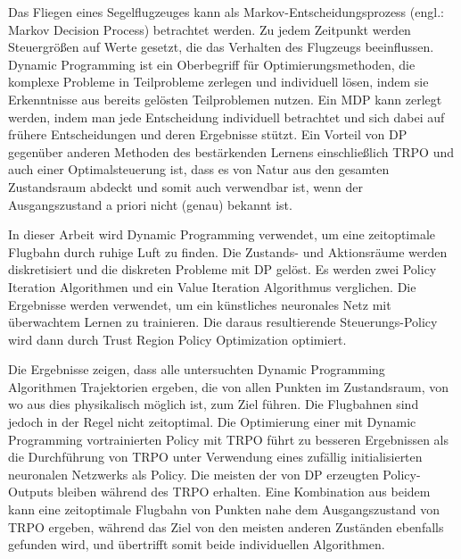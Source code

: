 Das Fliegen eines Segelflugzeuges kann als Markov-Entscheidungsprozess (engl.: Markov Decision Process) betrachtet werden. Zu jedem Zeitpunkt werden Steuergrößen auf Werte gesetzt, die das Verhalten des Flugzeugs beeinflussen. Dynamic Programming ist ein Oberbegriff für Optimierungsmethoden, die komplexe Probleme in Teilprobleme zerlegen und individuell lösen, indem sie Erkenntnisse aus bereits gelösten Teilproblemen nutzen. Ein MDP kann zerlegt werden, indem man jede Entscheidung individuell betrachtet und sich dabei auf frühere Entscheidungen und deren Ergebnisse stützt. Ein Vorteil von DP gegenüber anderen Methoden des bestärkenden Lernens einschließlich TRPO und auch einer Optimalsteuerung ist, dass es von Natur aus den gesamten Zustandsraum abdeckt und somit auch verwendbar ist, wenn der Ausgangszustand a priori nicht (genau) bekannt ist.

In dieser Arbeit wird Dynamic Programming verwendet, um eine zeitoptimale Flugbahn durch ruhige Luft zu finden. Die Zustands- und Aktionsräume werden diskretisiert und die diskreten Probleme mit DP gelöst. Es werden zwei Policy Iteration Algorithmen und ein Value Iteration Algorithmus verglichen. Die Ergebnisse werden verwendet, um ein künstliches neuronales Netz mit überwachtem Lernen zu trainieren. Die daraus resultierende Steuerungs-Policy wird dann durch Trust Region Policy Optimization optimiert.

Die Ergebnisse zeigen, dass alle untersuchten Dynamic Programming Algorithmen Trajektorien ergeben, die von allen Punkten im Zustandsraum, von wo aus dies physikalisch möglich ist, zum Ziel führen. Die Flugbahnen sind jedoch in der Regel nicht zeitoptimal. Die Optimierung einer mit Dynamic Programming vortrainierten Policy mit TRPO führt zu besseren Ergebnissen als die Durchführung von TRPO unter Verwendung eines zufällig initialisierten neuronalen Netzwerks als Policy. Die meisten der von DP erzeugten Policy-Outputs bleiben während des TRPO erhalten. Eine Kombination aus beidem kann eine zeitoptimale Flugbahn von Punkten nahe dem Ausgangszustand von TRPO ergeben, während das Ziel von den meisten anderen Zuständen ebenfalls gefunden wird, und übertrifft somit beide individuellen Algorithmen.

\vfill~